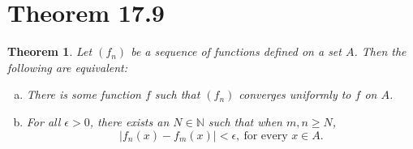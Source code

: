 \documentclass[openany, amssymb, psamsfonts]{amsart}
\newcommand{\bbN}{\mathbb{N}}
\newcommand{\abs}[1]{\lvert #1 \rvert}
\newtheorem{thm}{Theorem}[section]
\theoremstyle{definition}
\numberwithin{equation}{section}
\begin{document}
\section*{Theorem 17.9}
\begin{thm}
\label{17.9}
	Let $(f_n)$ be a sequence of functions defined on a set $A$. Then the following are equivalent: 
	\begin{enumerate}[(a)]
		\item There is some function $f$ such that $(f_n)$ converges uniformly to $f$ on $A$.
		\item For all $\epsilon > 0$, there exists an $N \in \bbN$ such that when $m, n \geq N$,
		\[
			\abs{f_n(x) - f_m(x)} < \epsilon, \ \text{for every } x \in A.
		\]

	\end{enumerate}
\end{thm}
\end{document}
